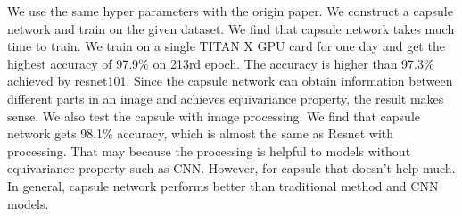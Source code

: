 \documentclass{article}
\begin{document}
We use the same hyper parameters with the origin paper. We construct a capsule network and train on the given dataset. We find that capsule network takes much time to train. We train on a single TITAN X GPU card for one day and get the highest accuracy of 97.9\% on 213rd epoch. The accuracy is higher than 97.3\% achieved by resnet101. Since the capsule network can obtain  information between different parts in an image and achieves equivariance property, the result makes sense. We also test the capsule with image processing. We find that capsule network gets 98.1\% accuracy, which is almost the same as Resnet with processing. That may because the processing is helpful to models without equivariance property such as CNN. However, for capsule that doesn't help much. In general, capsule network performs better than traditional method and CNN models.






\end{document}
